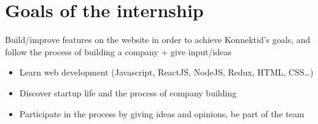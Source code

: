 \section{Goals of the internship}
\label{sec:goals}

Build/improve features on the website in order to achieve
Konnektid's goals, and follow the process of building a company + give input/ideas

\begin{itemize}
    \item Learn web development (Javascript, ReactJS, NodeJS, Redux, HTML, CSS\ldots)
    \item Discover startup life and the process of company building
    \item Participate in the process by giving ideas and opinions, be part of the team
\end{itemize}
